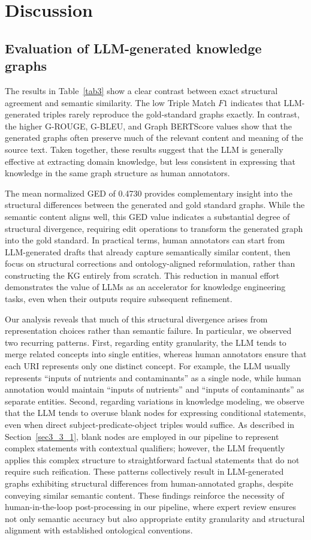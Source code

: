 \documentclass[preprint,12pt]{elsarticle}
\begin{document}
\section{Discussion}\label{sec5}
\subsection{Evaluation of LLM-generated knowledge graphs}\label{sec5_1}
The results in Table~\ref{tab3} show a clear contrast between exact structural agreement and semantic similarity. The low Triple Match $F1$ indicates that LLM-generated triples rarely reproduce the gold-standard graphs exactly. In contrast, the higher G-ROUGE, G-BLEU, and Graph BERTScore values show that the generated graphs often preserve much of the relevant content and meaning of the source text. Taken together, these results suggest that the LLM is generally effective at extracting domain knowledge, but less consistent in expressing that knowledge in the same graph structure as human annotators.

The mean normalized GED of 0.4730 provides complementary insight into the structural differences between the generated and gold standard graphs. While the semantic content aligns well, this GED value indicates a substantial degree of structural divergence, requiring edit operations to transform the generated graph into the gold standard. In practical terms, human annotators can start from LLM-generated drafts that already capture semantically similar content, then focus on structural corrections and ontology-aligned reformulation, rather than constructing the KG entirely from scratch. This reduction in manual effort demonstrates the value of LLMs as an accelerator for knowledge engineering tasks, even when their outputs require subsequent refinement.


Our analysis reveals that much of this structural divergence arises from representation choices rather than semantic failure. In particular, we observed two recurring patterns. First, regarding entity granularity, the LLM tends to merge related concepts into single entities, whereas human annotators ensure that each URI represents only one distinct concept. For example, the LLM usually represents ``inputs of nutrients and contaminants'' as a single node, while human annotation would maintain ``inputs of nutrients'' and ``inputs of contaminants'' as separate entities. Second, regarding variations in knowledge modeling, we observe that the LLM tends to overuse blank nodes for expressing conditional statements, even when direct subject-predicate-object triples would suffice. As described in Section~\ref{sec3_3_1}, blank nodes are employed in our pipeline to represent complex statements with contextual qualifiers; however, the LLM frequently applies this complex structure to straightforward factual statements that do not require such reification. These patterns collectively result in LLM-generated graphs exhibiting structural differences from human-annotated graphs, despite conveying similar semantic content. These findings reinforce the necessity of human-in-the-loop post-processing in our pipeline, where expert review ensures not only semantic accuracy but also appropriate entity granularity and structural alignment with established ontological conventions.
\end{document}
